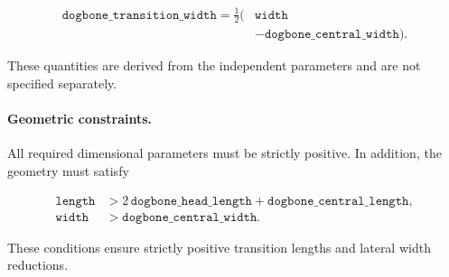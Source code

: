 \begin{equation}
\begin{aligned}
\texttt{dogbone\_transition\_width}
=\frac{1}{2}\bigl(
&\texttt{width}\\
&-\texttt{dogbone\_central\_width}
\bigr).
\end{aligned}
\end{equation}

These quantities are derived from the independent
parameters and are not specified separately.

\paragraph{Geometric constraints.}

All required dimensional parameters must be
strictly positive. In addition, the geometry
must satisfy

\begin{align}
\texttt{length}
&>
2\,\texttt{dogbone\_head\_length}
+\texttt{dogbone\_central\_length},
\\
\texttt{width}
&>
\texttt{dogbone\_central\_width}.
\end{align}

These conditions ensure strictly positive
transition lengths and lateral width reductions.
